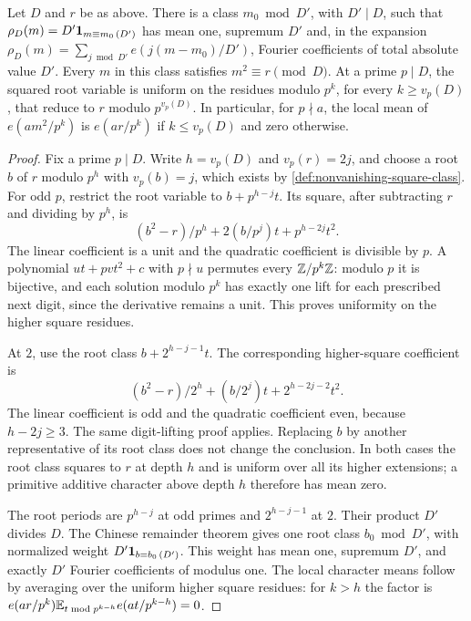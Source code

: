 \begin{lemma}
\label{lem:kernel-depth-classes}
Let $D$ and $r$ be as above. There is a class $m_0\bmod D'$, with
$D'\mid D$, such that $\rho_D(m)=D'\mathbf 1_{m\equiv m_0\,(D')}$ has mean one,
supremum $D'$ and, in the expansion $\rho_D(m)=\sum_{j\bmod D'}e(j(m-m_0)/D')$, Fourier coefficients of total absolute value $D'$.
Every $m$ in this class satisfies $m^2\equiv r\pmod D$. At a prime $p\mid D$,
the squared root variable is uniform on the residues modulo $p^k$, for every $k\ge v_p(D)$, that reduce to $r$ modulo $p^{v_p(D)}$. In particular, for $p\nmid a$, the local mean of
$e(am^2/p^k)$ is $e(ar/p^k)$ if $k\le v_p(D)$ and zero otherwise.
\end{lemma}
\begin{proof}
Fix a prime $p\mid D$. Write $h=v_p(D)$ and $v_p(r)=2j$, and choose a root $b$ of $r$
modulo $p^h$ with $v_p(b)=j$, which exists by
\cref{def:nonvanishing-square-class}. For odd $p$, restrict the root variable
to $b+p^{h-j}t$. Its square, after subtracting $r$ and dividing by
$p^h$, is
\[
 (b^2-r)/p^h+2(b/p^j)t+p^{h-2j}t^2.
\]
The linear coefficient is a unit and the quadratic coefficient is
divisible by $p$. A polynomial $u t+p v t^2+c$ with $p\nmid u$
permutes every $\mathbb Z/p^k\mathbb Z$: modulo $p$ it is bijective, and each
solution modulo $p^k$ has exactly one lift for each prescribed next
digit, since the derivative remains a unit. This proves uniformity
on the higher square residues.

At $2$, use the root class $b+2^{h-j-1}t$. The corresponding
higher-square coefficient is
\[
 (b^2-r)/2^h+(b/2^j)t+2^{h-2j-2}t^2.
\]
The linear coefficient is odd and the quadratic coefficient even,
because $h-2j\ge3$. The same digit-lifting proof applies. Replacing
$b$ by another representative of its root class does not change the
conclusion. In both cases the root class squares to $r$ at depth $h$
and is uniform over all its higher extensions; a primitive additive
character above depth $h$ therefore has mean zero.

The root periods are $p^{h-j}$ at odd primes and $2^{h-j-1}$ at
$2$. Their product $D'$ divides $D$. The Chinese remainder theorem
gives one root class $b_0\bmod D'$, with normalized weight
$D'\mathbf 1_{b=b_0\,(D')}$. This weight has mean one, supremum $D'$,
and exactly $D'$ Fourier coefficients of modulus one. The local character
means follow by averaging over the uniform higher square residues: for $k>h$ the factor is
$e(ar/p^k)\mathbb E_{t\bmod p^{k-h}}e(at/p^{k-h})=0$.
\end{proof}


